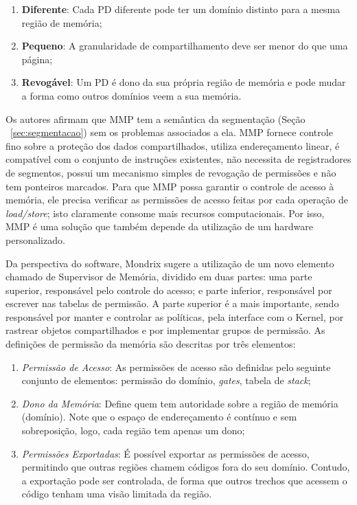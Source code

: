 \begin{enumerate}
	\item \textbf{Diferente}: Cada PD diferente pode ter um domínio distinto
				para a mesma região de memória;
	\item \textbf{Pequeno}: A granularidade de compartilhamento deve ser menor
				do que uma página;
	\item \textbf{Revogável}: Um PD é dono da sua própria região de memória e
				pode mudar a forma como outros domínios veem a sua memória.
\end{enumerate}

Os autores afirmam que MMP tem a semântica da segmentação (Seção ~\ref{sec:segmentacao}) sem os problemas
associados a ela. MMP fornece controle fino sobre a proteção dos dados
compartilhados, utiliza endereçamento linear, é compatível com o conjunto de instruções
existentes, não necessita de registradores de segmentos, possui um mecanismo
simples de revogação de permissões e não tem ponteiros marcados. Para que
MMP possa garantir o controle de acesso à memória, ele precisa verificar as
permissões de acesso feitas por cada operação de \emph{load/store}; isto
claramente consome mais recursos computacionais. Por isso, MMP é uma solução
que também depende da utilização de um hardware personalizado.


Da perspectiva do software, Mondrix \citep{mondrix} sugere a utilização de um
novo elemento chamado de Supervisor de Memória, dividido em duas partes:
uma parte superior, responsável pelo controle do acesso; e parte inferior, responsável
por escrever nas tabelas de permissão. A parte superior é a mais importante,
sendo responsável por manter e controlar as políticas, pela interface com o Kernel,
por rastrear objetos compartilhados e por implementar grupos de permissão. As
definições de permissão da memória são descritas por três elementos:

\begin{enumerate}
	\item \emph{Permissão de Acesso}: As permissões de acesso são definidas pelo
				seguinte conjunto de elementos: permissão do domínio, \emph{gates},
        tabela de \emph{stack};
	\item \emph{Dono da Memória}: Define quem tem autoridade sobre a região de
				memória (domínio). Note que o espaço de endereçamento é contínuo e sem
				sobreposição, logo, cada região tem apenas um dono;
	\item \emph{Permissões Exportadas}: É possível exportar as permissões de
				acesso, permitindo que outras regiões chamem códigos
				fora do seu domínio. Contudo, a exportação pode ser controlada, de forma
				que outros trechos que acessem o código tenham uma visão limitada da
				região.
\end{enumerate}


